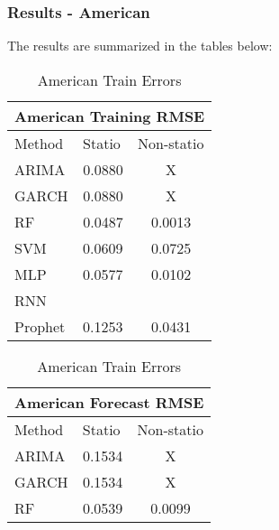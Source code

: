 \documentclass{beamer}
\begin{document}
	\begin{frame}
		\frametitle{Results - American}
		The results are summarized in the tables below:
		
		\begin{table}
			\parbox{.45\linewidth}{
				\centering
				\begin{tabular}{|lll|}
					\hline
					\multicolumn{3}{|c|}{American Training RMSE}                                                  \\ \hline
					\multicolumn{1}{|l|}{Method}  & \multicolumn{1}{l|}{Statio} & Non-statio             \\ \hline
					\multicolumn{1}{|l|}{ARIMA}   & \multicolumn{1}{c|}{0.0880}       & \multicolumn{1}{c|}{X} \\ \hline
					\multicolumn{1}{|l|}{GARCH}   & \multicolumn{1}{c|}{0.0880}       & \multicolumn{1}{c|}{X} \\ \hline
					\multicolumn{1}{|l|}{RF}      & \multicolumn{1}{c|}{0.0487}       & \multicolumn{1}{c|}{0.0013}  \\ \hline
					\multicolumn{1}{|l|}{SVM}     & \multicolumn{1}{l|}{0.0609}       & \multicolumn{1}{c|}{0.0725}  \\ \hline
					\multicolumn{1}{|l|}{MLP}     & \multicolumn{1}{l|}{0.0577}       & \multicolumn{1}{c|}{0.0102}  \\ \hline
					\multicolumn{1}{|l|}{RNN}     & \multicolumn{1}{l|}{}       & \multicolumn{1}{c|}{}  \\ \hline
					\multicolumn{1}{|l|}{Prophet} & \multicolumn{1}{l|}{0.1253}       & \multicolumn{1}{c|}{0.0431}  \\ \hline
				\end{tabular}
				\caption{American Train Errors}
			}
			\hfill
			\parbox{.45\linewidth}{
				\centering
				\begin{tabular}{|lll|}
					\hline
					\multicolumn{3}{|c|}{American Forecast RMSE}                                                  \\ \hline
					\multicolumn{1}{|l|}{Method}  & \multicolumn{1}{l|}{Statio} & Non-statio             \\ \hline
					\multicolumn{1}{|l|}{ARIMA}   & \multicolumn{1}{c|}{0.1534}       & \multicolumn{1}{c|}{X} \\ \hline
					\multicolumn{1}{|l|}{GARCH}   & \multicolumn{1}{c|}{0.1534}       & \multicolumn{1}{c|}{X} \\ \hline
					\multicolumn{1}{|l|}{RF}      & \multicolumn{1}{c|}{0.0539}       & \multicolumn{1}{c|}{0.0099}  \\ \hline

\end{tabular}}
\end{table}
\end{frame}
\end{document}
